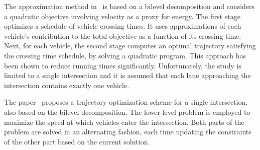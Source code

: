 \documentclass[a4paper]{report}
\theoremstyle{definition}
\theoremstyle{plain}
\begin{document}
The approximation method in~\cite{hultApproximateSolutionOptimal2015} is based
on a bilevel decomposition and considers a quadratic objective involving
velocity as a proxy for energy. The first stage optimizes a schedule of vehicle
crossing times. It uses approximations of each vehicle's contribution to the
total objective as a function of its crossing time. Next, for each vehicle, the
second stage computes an optimal trajectory satisfying the crossing time
schedule, by solving a quadratic program. This approach has been shown to reduce
running times significantly. Unfortunately, the study is limited to a single
intersection and it is assumed that each lane approaching the intersection
contains exactly one vehicle.

The paper~\cite{zhaoBilevelProgrammingModel2021} proposes a trajectory
optimization scheme for a single intersection, also based on the bilevel
decomposition. The lower-level problem is employed to maximize the speed at
which vehicles enter the intersection. Both parts of the problem are solved in an alternating
fashion, each time updating the constraints of the other part based on the
current solution.



\end{document}
